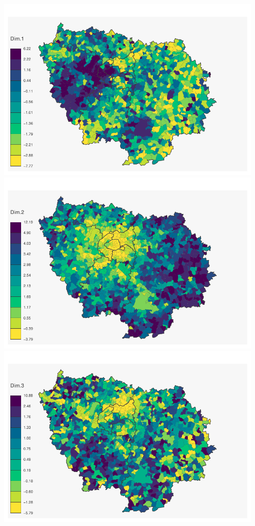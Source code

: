 \documentclass[
]{book}
\begin{document}
\includegraphics{manuel_geo_quanti_files/figure-latex/unnamed-chunk-75-1.pdf} \includegraphics{manuel_geo_quanti_files/figure-latex/unnamed-chunk-75-2.pdf} \includegraphics{manuel_geo_quanti_files/figure-latex/unnamed-chunk-75-3.pdf}
\end{document}
